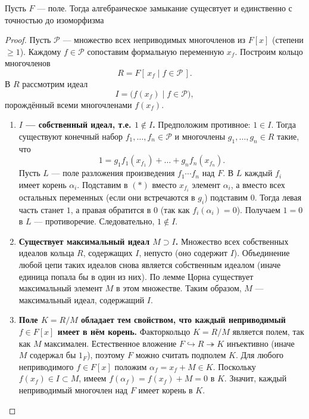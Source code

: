 \begin{theorem}
    Пусть \(F\) --- поле. Тогда алгебраическое замыкание сущесвтует и единственно с точностью до изоморфизма
\end{theorem}
\begin{proof}
    Пусть \(\mathcal{P}\) — множество всех неприводимых многочленов из \(F[x]\) (степени \(\ge 1\)). Каждому \(f \in \mathcal{P}\) сопоставим формальную переменную \(x_f\). Построим кольцо многочленов
    \[
    R = F[\,x_f \mid f \in \mathcal{P}\,].
    \]
    В \(R\) рассмотрим идеал
    \[
    I = \bigl( f(x_f) \mid f \in \mathcal{P} \bigr),
    \]
    порождённый всеми многочленами \(f(x_f)\).

    \begin{enumerate}
        \item \textbf{\(I\) — собственный идеал, т.е. \(1 \notin I\).}  
        Предположим противное: \(1 \in I\). Тогда существуют конечный набор \(f_1,\dots,f_n \in \mathcal{P}\) и многочлены \(g_1,\dots,g_n \in R\) такие, что
        \[
        1 = g_1 f_1(x_{f_1}) + \dots + g_n f_n(x_{f_n}). \tag{*}
        \]
        Пусть \(L\) — поле разложения произведения \(f_1 \cdots f_n\) над \(F\). В \(L\) каждый \(f_i\) имеет корень \(\alpha_i\). Подставим в \((*)\) вместо \(x_{f_i}\) элемент \(\alpha_i\), а вместо всех остальных переменных (если они встречаются в \(g_i\)) подставим \(0\). Тогда левая часть станет \(1\), а правая обратится в \(0\) (так как \(f_i(\alpha_i)=0\)). Получаем \(1=0\) в \(L\) — противоречие. Следовательно, \(1 \notin I\).

        \item \textbf{Существует максимальный идеал \(M \supset I\).}  
        Множество всех собственных идеалов кольца \(R\), содержащих \(I\), непусто (оно содержит \(I\)). Объединение любой цепи таких идеалов снова является собственным идеалом (иначе единица попала бы в один из них). По лемме Цорна существует максимальный элемент \(M\) в этом множестве. Таким образом, \(M\) — максимальный идеал, содержащий \(I\).

        \item \textbf{Поле \(K = R/M\) обладает тем свойством, что каждый неприводимый \(f \in F[x]\) имеет в нём корень.}  
        Факторкольцо \(K = R/M\) является полем, так как \(M\) максимален. Естественное вложение \(F \hookrightarrow R \twoheadrightarrow K\) инъективно (иначе \(M\) содержал бы \(1_F\)), поэтому \(F\) можно считать подполем \(K\). Для любого неприводимого \(f \in F[x]\) положим \(\alpha_f = x_f + M \in K\). Поскольку \(f(x_f) \in I \subset M\), имеем \(f(\alpha_f) = f(x_f) + M = 0\) в \(K\). Значит, каждый неприводимый многочлен над \(F\) имеет корень в \(K\).


\end{enumerate}
\end{proof}

